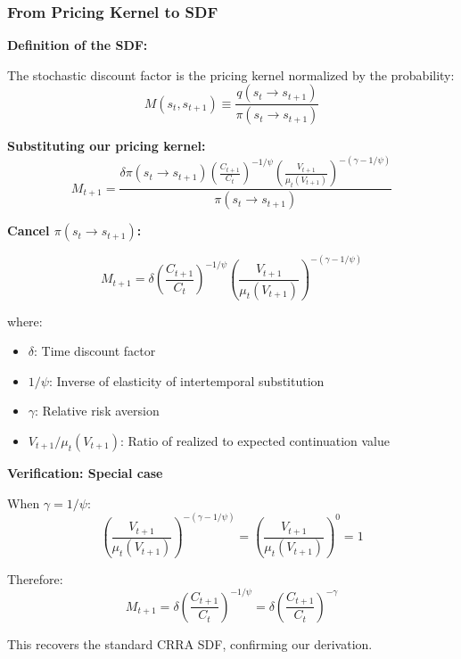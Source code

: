 \documentclass{beamer}
\begin{document}
\begin{frame}[allowframebreaks]
    \frametitle{From Pricing Kernel to SDF}
    
    \textbf{Definition of the SDF:}
    
    The stochastic discount factor is the pricing kernel normalized by the probability:
    \begin{equation*}
        M(s_t, s_{t+1}) \equiv \frac{q(s_t \to s_{t+1})}{\pi(s_t \to s_{t+1})}
    \end{equation*}
    
    \textbf{Substituting our pricing kernel:}
    \begin{equation*}
        M_{t+1} = \frac{\delta \pi(s_t \to s_{t+1}) \left( \frac{C_{t+1}}{C_t} \right)^{-1/\psi} \left( \frac{V_{t+1}}{\mu_t(V_{t+1})} \right)^{-(\gamma - 1/\psi)}}{\pi(s_t \to s_{t+1})}
    \end{equation*}
    
    \framebreak
    
    \textbf{Cancel $\pi(s_t \to s_{t+1})$:}
    
    \begin{tcolorbox}[colback=blue!5!white, colframe=blue!75!black, title=Epstein-Zin SDF (Final Form)]
    \begin{equation*}
        M_{t+1} = \delta \left( \frac{C_{t+1}}{C_t} \right)^{-1/\psi} \left( \frac{V_{t+1}}{\mu_t(V_{t+1})} \right)^{-(\gamma - 1/\psi)}
    \end{equation*}
    \end{tcolorbox}
    
    where:
    \begin{itemize}
        \item $\delta$: Time discount factor
        \item $1/\psi$: Inverse of elasticity of intertemporal substitution
        \item $\gamma$: Relative risk aversion
        \item $V_{t+1}/\mu_t(V_{t+1})$: Ratio of realized to expected continuation value
    \end{itemize}
    
    \framebreak
    
    \textbf{Verification: Special case}
    
    When $\gamma = 1/\psi$:
    \begin{equation*}
        \left( \frac{V_{t+1}}{\mu_t(V_{t+1})} \right)^{-(\gamma - 1/\psi)} = \left( \frac{V_{t+1}}{\mu_t(V_{t+1})} \right)^{0} = 1
    \end{equation*}
    
    Therefore:
    \begin{equation*}
        M_{t+1} = \delta \left( \frac{C_{t+1}}{C_t} \right)^{-1/\psi} = \delta \left( \frac{C_{t+1}}{C_t} \right)^{-\gamma}
    \end{equation*}
    
    This recovers the standard CRRA SDF, confirming our derivation.
\end{frame}
\end{document}
